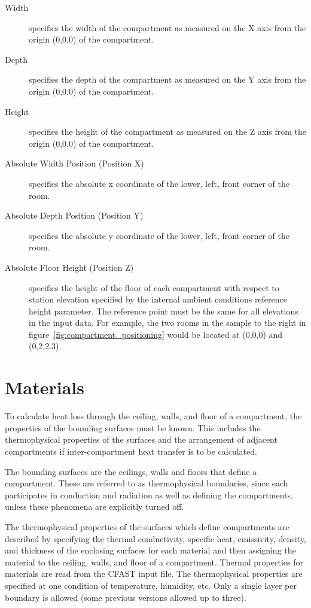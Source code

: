 \label{Compartment_Inputs}
\begin{description}
\item[Width] specifies the width of the compartment as measured on the X axis from the origin (0,0,0) of the compartment.

\item[Depth] specifies the depth of the compartment as measured on the Y axis from the origin (0,0,0) of the compartment.

\item[Height] specifies the height of the compartment as measured on the Z axis from the origin (0,0,0) of the compartment.

\item[Absolute Width Position (Position X)] specifies the absolute x coordinate of the lower, left, front corner of the room.

\item[Absolute Depth Position (Position Y)] specifies the absolute y coordinate of the lower, left, front corner of the room.

\item[Absolute Floor Height (Position Z)] specifies the height of the floor of each compartment with respect to station elevation specified by the internal ambient conditions reference height parameter.  The reference point must be the same for all elevations in the input data.  For example, the two rooms in the sample to the right in figure~\ref{fig:compartment_positioning} would be located at (0,0,0) and (0,2,2.3).
\end{description}

\section{Materials}

To calculate heat loss through the ceiling, walls, and floor of a compartment, the properties of the bounding surfaces must be known. This includes the thermophysical properties of the surfaces and the arrangement of adjacent compartments if inter-compartment heat transfer is to be calculated.

The bounding surfaces are the ceilings, walls and floors that define a compartment. These are referred to as thermophysical boundaries, since each participates in conduction and radiation as well as defining the compartments, unless these phenomena are explicitly turned off.

The thermophysical properties of the surfaces which define compartments are described by specifying the thermal conductivity, specific heat, emissivity, density, and thickness of the enclosing surfaces for each material and then assigning the material to the ceiling, walls, and floor of a compartment.  Thermal properties for materials are read from the CFAST input file.  The thermophysical properties are specified at one condition of temperature, humidity, etc.  Only a single layer per boundary is allowed (some previous versions allowed up to three).

